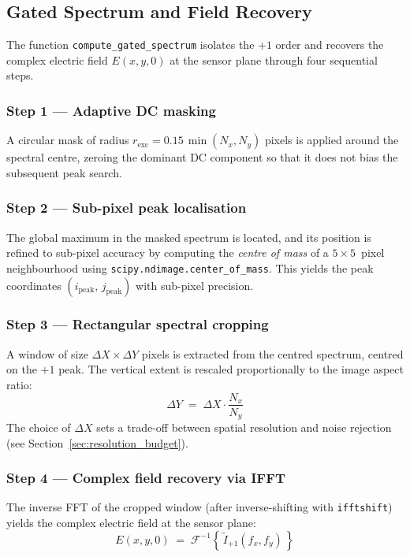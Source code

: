 \subsection{Gated Spectrum and Field Recovery}

The function \texttt{compute\_gated\_spectrum} isolates the $+1$ order and
recovers the complex electric field $E(x,y,0)$ at the sensor plane through
four sequential steps.

\subsubsection*{Step 1 — Adaptive DC masking}
A circular mask of radius
$r_\text{exc} = 0.15\,\min(N_x,N_y)$ pixels is applied around the spectral
centre, zeroing the dominant DC component so that it does not bias the
subsequent peak search.

\subsubsection*{Step 2 — Sub-pixel peak localisation}
The global maximum in the masked spectrum is located, and its position is
refined to sub-pixel accuracy by computing the \textit{centre of mass} of a
$5{\times}5$~pixel neighbourhood using
\texttt{scipy.ndimage.center\_of\_mass}.
This yields the peak coordinates $(i_\text{peak},\,j_\text{peak})$ with
sub-pixel precision.

\subsubsection*{Step 3 — Rectangular spectral cropping}
A window of size $\Delta X \times \Delta Y$ pixels is extracted from the
centred spectrum, centred on the $+1$ peak.
The vertical extent is rescaled proportionally to the image aspect ratio:
\begin{equation}
    \Delta Y \;=\; \Delta X \cdot \frac{N_x}{N_y}
\end{equation}
The choice of $\Delta X$ sets a trade-off between spatial resolution
and noise rejection (see Section~\ref{sec:resolution_budget}).

\subsubsection*{Step 4 — Complex field recovery via IFFT}
The inverse FFT of the cropped window (after inverse-shifting with
\texttt{ifftshift}) yields the complex electric field at the sensor plane:
\begin{equation}
    E(x,y,0) \;=\; \mathcal{F}^{-1}\!\left\{\,\tilde{I}_{+1}(f_x,f_y)\,\right\}
    \label{eq:field_ifft}
\end{equation}

